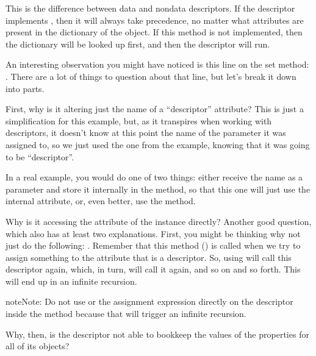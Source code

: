 \documentclass[a4paper,10pt,english]{sphinxmanual}
\begin{document}
This is the difference between data and non\sphinxhyphen{}data descriptors. If the descriptor implements
, then it will always take precedence, no matter what attributes are present in
the dictionary of the object. If this method is not implemented, then the dictionary will be
looked up first, and then the descriptor will run.

An interesting observation you might have noticed is this line on the set method:
. There are a lot of things to question about that line, but let’s
break it down into parts.

First, why is it altering just the name of a “descriptor” attribute? This is just a
simplification for this example, but, as it transpires when working with descriptors, it
doesn’t know at this point the name of the parameter it was assigned to, so we just used the
one from the example, knowing that it was going to be “descriptor”.

In a real example, you would do one of two things: either receive the name as a parameter
and store it internally in the  method, so that this one will just use the internal
attribute, or, even better, use the  method.

Why is it accessing the  attribute of the instance directly? Another good question,
which also has at least two explanations. First, you might be thinking why not just do the
following: . Remember that this method ()
is called when we try to assign something to the
attribute that is a descriptor. So, using  will call this descriptor again,
which, in turn, will call it again, and so on and so forth. This will end up in an infinite
recursion.

\begin{sphinxadmonition}{note}{Note:}
Do not use  or the assignment expression directly on the descriptor inside the  method because that will trigger an infinite recursion.
\end{sphinxadmonition}

Why, then, is the descriptor not able to book\sphinxhyphen{}keep the values of the properties for all of its
objects?
\end{document}
